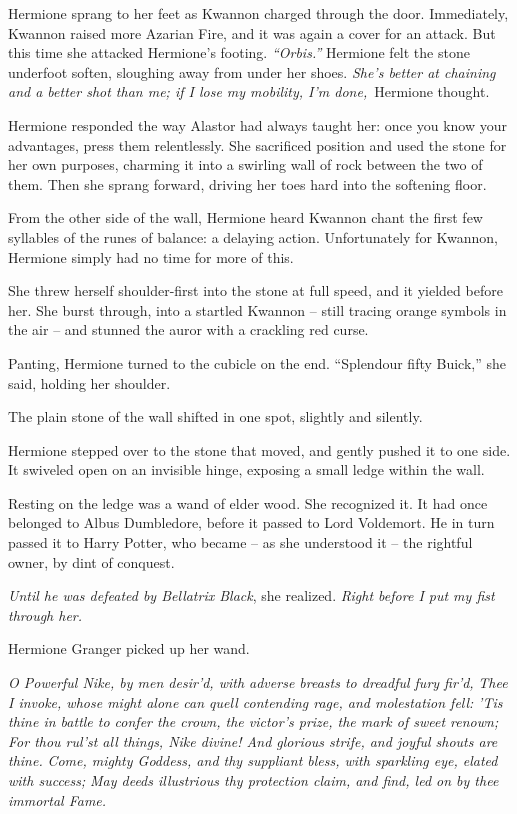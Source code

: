 Hermione sprang to her feet as Kwannon charged through the door.
Immediately, Kwannon raised more Azarian Fire, and it was again a cover
for an attack. But this time she attacked Hermione's footing.
\emph{``Orbis.''} Hermione felt the stone underfoot soften, sloughing
away from under her shoes. \emph{She's better at chaining and a better
shot than me; if I lose my mobility, I'm done,}~Hermione thought.

Hermione responded the way Alastor had always taught her: once you know
your advantages, press them relentlessly. She sacrificed position and
used the stone for her own purposes, charming it into a swirling wall of
rock between the two of them. Then she sprang forward, driving her toes
hard into the softening floor.

From the other side of the wall, Hermione heard Kwannon chant the first
few syllables of the runes of balance: a delaying action. Unfortunately
for Kwannon, Hermione simply had no time for more of this.

She threw herself shoulder-first into the stone at full speed, and it
yielded before her. She burst through, into a startled Kwannon -- still
tracing orange symbols in the air -- and stunned the auror with a
crackling red curse.

Panting, Hermione turned to the cubicle on the end. ``Splendour fifty
Buick,'' she said, holding her shoulder.

The plain stone of the wall shifted in one spot, slightly and silently.

Hermione stepped over to the stone that moved, and gently pushed it to
one side. It swiveled open on an invisible hinge, exposing a small ledge
within the wall.

Resting on the ledge was a wand of elder wood. She recognized it. It had
once belonged to Albus Dumbledore, before it passed to Lord Voldemort.
He in turn passed it to Harry Potter, who became -- as she understood it
-- the rightful owner, by dint of conquest.

\emph{Until he was defeated by Bellatrix Black}, she realized.
\emph{Right before I put my fist through her.}

Hermione Granger picked up her wand.

\mybreak

\emph{O Powerful Nike, by men desir'd, with adverse breasts to dreadful
fury fir'd,} \emph{Thee I invoke, whose might alone can quell contending
rage, and molestation fell:} \emph{'Tis thine in battle to confer the
crown, the victor's prize, the mark of sweet renown;} \emph{For thou
rul'st all things, Nike divine! And glorious strife, and joyful shouts
are thine.} \emph{Come, mighty Goddess, and thy suppliant bless, with
sparkling eye, elated with success;} \emph{May deeds illustrious thy
protection claim, and find, led on by thee immortal Fame.}

